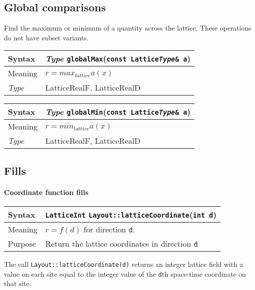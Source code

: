 \documentclass[12pt,letterpaper]{article}
\newcommand{\tLatticeInt}{LatticeInt}
\newcommand{\tLatticeRealF}{LatticeRealF}
\newcommand{\tLatticeRealD}{LatticeRealD}
\newcommand{\itt}{\it Type}
\begin{document}
\subsection{Global comparisons}

Find the maximum or minimum of a quantity across the lattice. These
operations do not have subset variants.

\begin{flushleft}
  \begin{tabular}{|l|l|}
  \hline
  Syntax      & {\it Type} \verb|globalMax|({\tt const Lattice{\it Type}\& a})\\
  \hline
  Meaning     & $r = max_{lattice} a(x)$ \\
  \hline
  \itt        & \tLatticeRealF, \tLatticeRealD \\
  \hline
  \end{tabular}
\end{flushleft}


\begin{flushleft}
  \begin{tabular}{|l|l|}
  \hline
  Syntax      & {\it Type} \verb|globalMin|({\tt const Lattice{\it Type}\& a})\\
  \hline
  Meaning     & $r = min_{lattice} a(x)$ \\
  \hline
  \itt        & \tLatticeRealF, \tLatticeRealD \\
  \hline
  \end{tabular}
\end{flushleft}


\subsection{Fills}

\paragraph{Coordinate function fills}

\begin{flushleft}
  \begin{tabular}{|l|l|}
  \hline
  Syntax      & {\tt \tLatticeInt} \verb|Layout::latticeCoordinate|({\tt int d})\\
  \hline
  Meaning     & $r = f(d)$ for direction \verb|d|.\\
  \hline
  Purpose     & Return the lattice coordinates in direction \verb|d|\\
  \hline
  \end{tabular}
\end{flushleft}
%
The call \verb|Layout::latticeCoordinate(d)| returns an integer lattice field with a
value on each site equal to the integer value of the \verb|d|th
space-time coordinate on that site.
\end{document}
